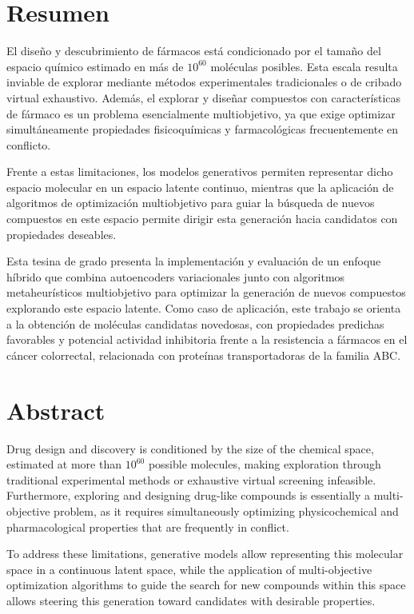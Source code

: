 \thispagestyle{plain}
\chapter*{Resumen}

El diseño y descubrimiento de fármacos está condicionado por el tamaño del espacio químico estimado en más de $10^{60}$ moléculas posibles. Esta escala resulta inviable de explorar mediante métodos experimentales tradicionales o de cribado virtual exhaustivo. Además, el explorar y diseñar compuestos con características de fármaco es un problema esencialmente multiobjetivo, ya que exige optimizar simultáneamente propiedades fisicoquímicas y farmacológicas frecuentemente en conflicto.

Frente a estas limitaciones, los modelos generativos permiten representar dicho espacio molecular en un espacio latente continuo, mientras que la aplicación de algoritmos de optimización multiobjetivo para guiar la búsqueda de nuevos compuestos en este espacio permite dirigir esta generación hacia candidatos con propiedades deseables.

Esta tesina de grado presenta la implementación y evaluación de un enfoque híbrido que combina autoencoders variacionales junto con algoritmos metaheurísticos multiobjetivo para optimizar la generación de nuevos compuestos explorando este espacio latente. Como caso de aplicación, este trabajo se orienta a la obtención de moléculas candidatas novedosas, con propiedades predichas favorables y potencial actividad inhibitoria frente a la resistencia a fármacos en el cáncer colorrectal, relacionada con proteínas transportadoras de la familia ABC.


\clearpage

\thispagestyle{plain}
\chapter*{Abstract}

Drug design and discovery is conditioned by the size of the chemical space, estimated at more than $10^{60}$ possible molecules, making exploration through traditional experimental methods or exhaustive virtual screening infeasible. Furthermore, exploring and designing drug-like compounds is essentially a multi-objective problem, as it requires simultaneously optimizing physicochemical and pharmacological properties that are frequently in conflict.

To address these limitations, generative models allow representing this molecular space in a continuous latent space, while the application of multi-objective optimization algorithms to guide the search for new compounds within this space allows steering this generation toward candidates with desirable properties.

